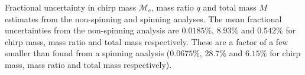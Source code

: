 \label{fig:mass_std} Fractional uncertainty in chirp mass $\mathcal{M}_\mathrm{c}$, mass ratio $q$ and total mass $M$ estimates from the non-spinning and spinning analyses.  The mean fractional uncertainties from the non-spinning analysis are $0.0185\%$, $8.93\%$ and $0.542\%$ for chirp mass, mass ratio and total mass respectively.  These are a factor of a few smaller than found from a spinning analysis ($0.0675\%$, $28.7\%$ and $6.15\%$ for chirp mass, mass ratio and total mass respectively).
  
  